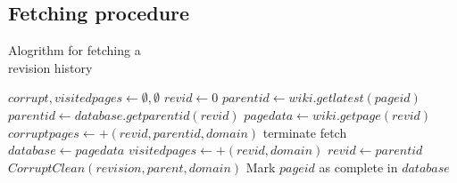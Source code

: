 \documentclass[t]{beamer}
\begin{document}
  \subsection{Fetching procedure}
  \begin{frame}[fragile]{Alogrithm for fetching a \\revision history}    
        \tiny  
      \begin{algorithmic}
        \tiny
          \State $corrupt,visitedpages \gets \emptyset , \emptyset$
          \State $revid \gets 0$
          \State $parentid \gets wiki.getlatest(pageid)$
          \label{datal1} 
          \State $parentid \gets database.getparentid(revid)$
          \Else
          \State $pagedata \gets wiki.getpage(revid)$
          \EndIf
          \label{datal3}
          \State $corruptpages \gets + (revid, parentid, domain)$
          \Else
          \State terminate fetch\label{datal4}
          \EndIf
          \Else
          \State $database \gets page data$
          \EndIf
          \State $visitedpages \gets + (revid, domain)$
          \State $revid \gets parentid$\label{datal2}
          \EndWhile
          \State $CorruptClean(revision, parent, domain)$
          \EndFor
          \State Mark $pageid$ as complete in $database$
          \EndProcedure
        \end{algorithmic}
\end{frame}

\end{document}
